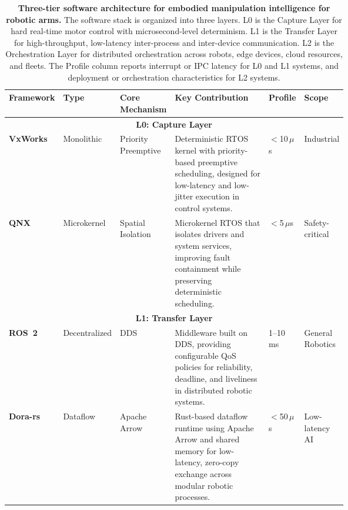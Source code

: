 \documentclass[acmsmall,screen,review]{acmart}
\begin{document}
\begin{table}[t]
\centering
\caption{\textbf{Three-tier software architecture for embodied manipulation intelligence for robotic arms.}
The software stack is organized into three layers. L0 is the Capture Layer for hard real-time motor control with microsecond-level determinism. L1 is the Transfer Layer for high-throughput, low-latency inter-process and inter-device communication. L2 is the Orchestration Layer for distributed orchestration across robots, edge devices, cloud resources, and fleets. The Profile column reports interrupt or IPC latency for L0 and L1 systems, and deployment or orchestration characteristics for L2 systems.}\label{tab:framework_comparison}
\renewcommand{\arraystretch}{1.2}
\setlength{\tabcolsep}{3pt}
\scriptsize

\begin{tabular}{
  l
  l
  p{0.15\linewidth}
  p{0.34\linewidth}
  p{0.06\linewidth}
  p{0.12\linewidth}
}
\toprule
\textbf{Framework} &
\textbf{Type} &
\textbf{Core Mechanism} &
\textbf{Key Contribution} &
\textbf{Profile} &
\textbf{Scope} \\
\midrule

\multicolumn{6}{c}{\textbf{L0: Capture Layer}} \\
\midrule

\textbf{VxWorks}~\cite{xu2014mpi} &
Monolithic&
Priority Preemptive &
Deterministic RTOS kernel with priority-based preemptive scheduling, designed for low-latency and low-jitter execution in control systems. &
$<$10\,$\mu$s &
Industrial \\

\textbf{QNX}~\cite{dan1992architectural} &
Microkernel &
Spatial Isolation &
Microkernel RTOS that isolates drivers and system services, improving fault containment while preserving deterministic scheduling. &
$<$5\,$\mu$s &
Safety-critical \\

\midrule
\multicolumn{6}{c}{\textbf{L1: Transfer Layer}} \\
\midrule

\textbf{ROS~2}~\cite{macenski2022robot} &
Decentralized &
DDS &
Middleware built on DDS, providing configurable QoS policies for reliability, deadline, and liveliness in distributed robotic systems. &
1--10\,ms &
General Robotics \\

\textbf{Dora-rs}~\cite{zhang2026dora} &
Dataflow &
Apache Arrow &
Rust-based dataflow runtime using Apache Arrow and shared memory for low-latency, zero-copy exchange across modular robotic processes. &
$<$50\,$\mu$s &
Low-latency AI \\


\end{tabular}
\end{table}
\end{document}
